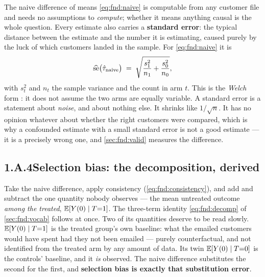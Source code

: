 The naive difference of means \cref{eq:fnd:naive} is computable from any customer file and needs
no assumptions to \emph{compute}; whether it means anything causal is the whole question. Every
estimate also carries a \textbf{standard error}: the typical distance between the estimate and the
number it is estimating, caused purely by the luck of which customers landed in the sample. For
\cref{eq:fnd:naive} it is
%
\begin{equation}
  \widehat{\operatorname{se}}\big(\hat\tau_{\text{naive}}\big)
    \;=\; \sqrt{\frac{s_1^{2}}{n_1} + \frac{s_0^{2}}{n_0}},
  \label{eq:fnd:welchse}
\end{equation}
%
with $s_t^2$ and $n_t$ the sample variance and the count in arm $t$. This is the \emph{Welch}
form \citep{welch1947}: it does not assume the two arms are equally variable. A standard error is
a statement about \emph{noise}, and about nothing else. It shrinks like $1/\sqrt n$. It has no
opinion whatever about whether the right customers were compared, which is why a confounded
estimate with a small standard error is not a good estimate --- it is a precisely wrong one, and
\cref{sec:fnd:valid} measures the difference.

\subsection*{1.A.4\quad Selection bias: the decomposition, derived}

Take the naive difference, apply consistency (\cref{eq:fnd:consistency}), and add and subtract the
one quantity nobody observes --- the mean untreated outcome \emph{among the treated},
$\operatorname{\mathbb{E}}[Y(0) \mid T{=}1]$. The three-term identity \cref{eq:fnd:decomp} of \cref{sec:fnd:vocab}
follows at once. Two of its quantities deserve to be read slowly. $\operatorname{\mathbb{E}}[Y(0) \mid T{=}1]$ is the
treated group's own baseline: what the emailed customers would have spent had they not been
emailed --- purely counterfactual, and not identified from the treated arm by any amount of data.
Its twin $\operatorname{\mathbb{E}}[Y(0) \mid T{=}0]$ is the controls' baseline, and it \emph{is} observed. The naive
difference substitutes the second for the first, and \textbf{selection bias is exactly that
substitution error}.


